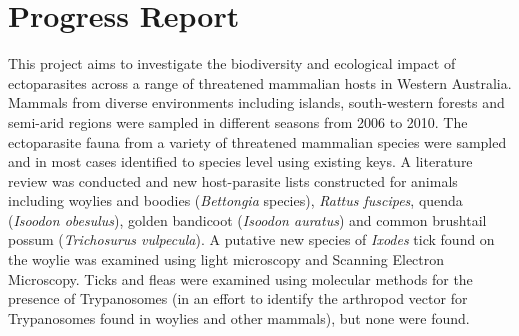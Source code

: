 \documentclass[version=last, paper=a4, DIV=18, usenames, dvipsnames]{scrartcl}
\begin{document}
%

%




\section*{Progress Report}
This project aims to investigate the biodiversity and ecological impact
of ectoparasites across a range of threatened mammalian hosts in Western
Australia. Mammals from diverse environments including islands,
south-western forests and semi-arid regions were sampled in different
seasons from 2006 to 2010. The ectoparasite fauna from a variety of
threatened mammalian species were sampled and in most cases identified
to species level using existing keys. A literature review was conducted
and new host-parasite lists constructed for animals including woylies
and boodies (\emph{Bettongia} species), \emph{Rattus fuscipes}, quenda
(\emph{Isoodon obesulus}), golden bandicoot (\emph{Isoodon auratus}) and
common brushtail possum (\emph{Trichosurus vulpecula}). A putative new
species of \emph{Ixodes} tick found on the woylie was examined using
light microscopy and Scanning Electron Microscopy. Ticks and fleas were
examined using molecular methods for the presence of Trypanosomes (in an
effort to identify the arthropod vector for Trypanosomes found in
woylies and other mammals), but none were found.




\clearpage
\end{document}
